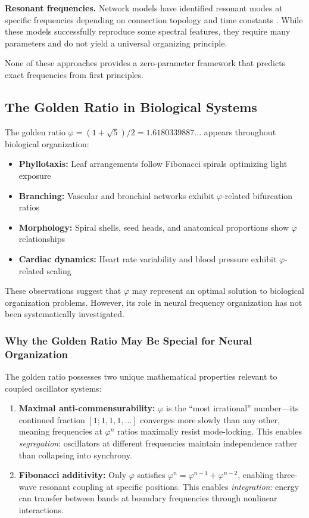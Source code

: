 \documentclass[11pt,a4paper]{article}
\newcommand{\phisym}{\varphi}
\begin{document}
\textbf{Resonant frequencies.} Network models have identified resonant modes at specific frequencies depending on connection topology and time constants \citep{nunez2006}. While these models successfully reproduce some spectral features, they require many parameters and do not yield a universal organizing principle.

None of these approaches provides a zero-parameter framework that predicts exact frequencies from first principles.

\subsection{The Golden Ratio in Biological Systems}

The golden ratio $\phisym = (1 + \sqrt{5})/2 = 1.6180339887...$ appears throughout biological organization:

\begin{itemize}
    \item \textbf{Phyllotaxis:} Leaf arrangements follow Fibonacci spirals optimizing light exposure \citep{douady1996}
    \item \textbf{Branching:} Vascular and bronchial networks exhibit $\phisym$-related bifurcation ratios \citep{west1997}
    \item \textbf{Morphology:} Spiral shells, seed heads, and anatomical proportions show $\phisym$ relationships \citep{livio2002}
    \item \textbf{Cardiac dynamics:} Heart rate variability and blood pressure exhibit $\phisym$-related scaling \citep{goldberger2002}
\end{itemize}

These observations suggest that $\phisym$ may represent an optimal solution to biological organization problems. However, its role in neural frequency organization has not been systematically investigated.

\subsubsection{Why the Golden Ratio May Be Special for Neural Organization}

The golden ratio possesses two unique mathematical properties relevant to coupled oscillator systems:

\begin{enumerate}
    \item \textbf{Maximal anti-commensurability:} $\phisym$ is the ``most irrational'' number---its continued fraction $[1; 1, 1, 1, ...]$ converges more slowly than any other, meaning frequencies at $\phisym^n$ ratios maximally resist mode-locking. This enables \textit{segregation}: oscillators at different frequencies maintain independence rather than collapsing into synchrony.

    \item \textbf{Fibonacci additivity:} Only $\phisym$ satisfies $\phisym^n = \phisym^{n-1} + \phisym^{n-2}$, enabling three-wave resonant coupling at specific positions. This enables \textit{integration}: energy can transfer between bands at boundary frequencies through nonlinear interactions.
\end{enumerate}
\end{document}
